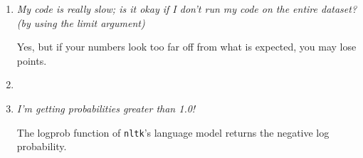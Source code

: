 \documentclass[11pt]{article}
\begin{document}
\begin{enumerate}

\item \textit{My code is really slow; is it okay if I don't run my code on the entire dataset?  (by using the limit argument)}

Yes, but if your numbers look too far off from what is expected, you may lose points.

\item \item \textit{I'm getting probabilities greater than 1.0!}

The logprob function of \texttt{nltk}'s language model returns the negative log probability.

\end{enumerate}
\end{document}
